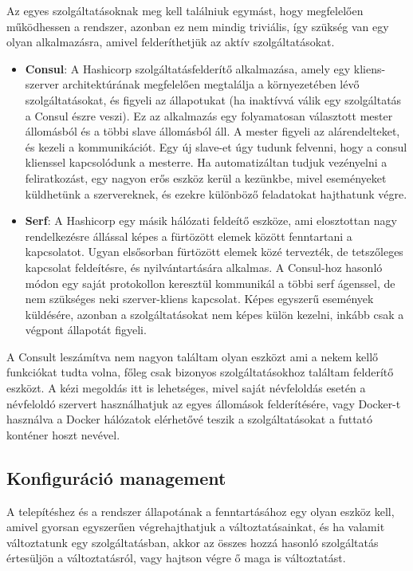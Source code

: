 \documentclass[11pt,magyar,a4paper,twoside,]{report}
\begin{document}
Az egyes szolgáltatásoknak meg kell találniuk egymást, hogy megfelelően
működhessen a rendszer, azonban ez nem mindig triviális, így szükség van
egy olyan alkalmazásra, amivel felderíthetjük az aktív szolgáltatásokat.

\begin{itemize}
\item
  \textbf{Consul}\citep{consul}: A Hashicorp szolgáltatásfelderítő
  alkalmazása, amely egy kliens-szerver architektúrának megfelelően
  megtalálja a környezetében lévő szolgáltatásokat, és figyeli az
  állapotukat (ha inaktívvá válik egy szolgáltatás a Consul észre
  veszi). Ez az alkalmazás egy folyamatosan választott mester állomásból
  és a többi slave állomásból áll. A mester figyeli az alárendelteket,
  és kezeli a kommunikációt. Egy új slave-et úgy tudunk felvenni, hogy a
  consul klienssel kapcsolódunk a mesterre. Ha automatizáltan tudjuk
  vezényelni a feliratkozást, egy nagyon erős eszköz kerül a kezünkbe,
  mivel eseményeket küldhetünk a szervereknek, és ezekre különböző
  feladatokat hajthatunk végre.
\item
  \textbf{Serf}\citep{serf}: A Hashicorp egy másik hálózati feldeítő
  eszköze, ami elosztottan nagy rendelkezésre állással képes a fürtözött
  elemek között fenntartani a kapcsolatot. Ugyan elsősorban fürtözött
  elemek közé tervezték, de tetszőleges kapcsolat feldeítésre, és
  nyilvántartására alkalmas. A Consul-hoz hasonló módon egy saját
  protokollon keresztül kommunikál a többi serf ágenssel, de nem
  szükséges neki szerver-kliens kapcsolat. Képes egyszerű események
  küldésére, azonban a szolgáltatásokat nem képes külön kezelni, inkább
  csak a végpont állapotát figyeli.
\end{itemize}

A Consult leszámítva nem nagyon találtam olyan eszközt ami a nekem kellő
funkciókat tudta volna, főleg csak bizonyos szolgáltatásokhoz találtam
felderítő eszközt. A kézi megoldás itt is lehetséges, mivel saját
névfeloldás esetén a névfeloldó szervert használhatjuk az egyes
állomások felderítésére, vagy Docker-t használva a Docker hálózatok
elérhetővé teszik a szolgáltatásokat a futtató konténer hoszt nevével.

\subsection{Konfiguráció
management}\label{konfiguruxe1ciuxf3-management}

A telepítéshez és a rendszer állapotának a fenntartásához egy olyan
eszköz kell, amivel gyorsan egyszerűen végrehajthatjuk a
változtatásainkat, és ha valamit változtatunk egy szolgáltatásban, akkor
az összes hozzá hasonló szolgáltatás értesüljön a változtatásról, vagy
hajtson végre ő maga is változtatást.
\end{document}
